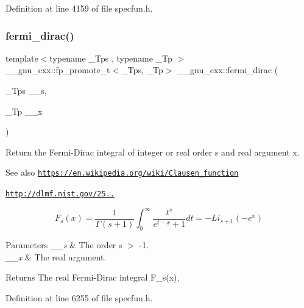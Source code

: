 Definition at line 4159 of file specfun.\+h.

\mbox{\label{group__gnu__math__spec__func_ga5468fbaed5cb8384cff7cfb9d2188d1a}} 
\subsubsection{\texorpdfstring{fermi\+\_\+dirac()}{fermi\_dirac()}}
{\footnotesize\ttfamily template$<$typename \+\_\+\+Tps , typename \+\_\+\+Tp $>$ \\
\+\_\+\+\_\+gnu\+\_\+cxx\+::fp\+\_\+promote\+\_\+t$<$\+\_\+\+Tps, \+\_\+\+Tp$>$ \+\_\+\+\_\+gnu\+\_\+cxx\+::fermi\+\_\+dirac (\begin{DoxyParamCaption}\item[{\+\_\+\+Tps}]{\+\_\+\+\_\+s,  }\item[{\+\_\+\+Tp}]{\+\_\+\+\_\+x }\end{DoxyParamCaption})\hspace{0.3cm}{\ttfamily [inline]}}

Return the Fermi-\/\+Dirac integral of integer or real order s and real argument x. \begin{DoxySeeAlso}{See also}
\href{https://en.wikipedia.org/wiki/Clausen_function}{\tt https\+://en.\+wikipedia.\+org/wiki/\+Clausen\+\_\+function} 

\href{http://dlmf.nist.gov/25.12.16}{\tt http\+://dlmf.\+nist.\+gov/25..}
\end{DoxySeeAlso}
\[ F_s(x) = \frac{1}{\Gamma(s+1)}\int_0^\infty \frac{t^s}{e^{t-x} + 1}dt = -Li_{s+1}(-e^x) \]


\begin{DoxyParams}{Parameters}
{\em \+\_\+\+\_\+s} & The order s $>$ -\/1. \\
\hline
{\em \+\_\+\+\_\+x} & The real argument. \\
\hline
\end{DoxyParams}
\begin{DoxyReturn}{Returns}
The real Fermi-\/\+Dirac integral F\+\_\+s(x), 
\end{DoxyReturn}


Definition at line 6255 of file specfun.\+h.

